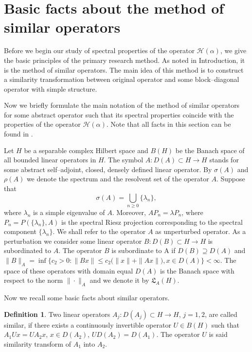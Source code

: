 \documentclass[11pt,centertags,reqno,twoside]{amsart}
\numberwithin{equation}{section}
\theoremstyle{definition}
\newtheorem{definition}[theorem]{Definition}
\theoremstyle{remark}
\begin{document}
\section{Basic facts about the method of similar operators}\label{sec4}

Before we begin our study of spectral properties of the operator $\mathcal{H}(\alpha)$,
we give the basic principles of the primary research method. As noted in Introduction,
it is the method of similar operators. The main idea of this method is to construct
a similarity transformation between original operator and some block--diagonal
operator with simple structure.

Now we briefly formulate the main notation of the method of similar operators
for some abstract operator such that its spectral properties coincide
with the properties of the operator $\mathcal{H}(\alpha)$. Note that all facts
in this section can be found in \cite[\S~2, 3]{BaskKrUsk}.

Let $H$ be a separable complex Hilbert space and $B(H)$ be the Banach space of
all bounded linear operators in $H$. The symbol $A: D(A)\subset H\to H$
stands for some abstract self--adjoint, closed, densely defined linear operator.
By $\sigma(A)$ and $\rho(A)$ we denote the spectrum and the resolvent set of
the operator $A$. Suppose that
\[
\sigma(A)=\bigcup_{n\geqslant 0}\{\lambda_n\},
\]
where $\lambda_n$ is a simple eigenvalue of $A$.
Moreover, $AP_n=\lambda P_n$, where $P_n=P(\{\lambda_n\}, A)$ is the spectral Riesz
projection corresponding to the spectral component $\{\lambda_n\}$. We shall refer
to the operator $A$ as unperturbed operator. As a perturbation we consider some
linear operator $B: D(B)\subset H\to H$ is subordinated to $A$. The operator
$B$ is subordinate to A if $D(B)\supseteq D(A)$ and $\|B\|_A=\inf\{c_2>0:
\|Bx\|\leqslant c_2\big(\|x\|+\|Ax\|\big), x\in D(A)\}<\infty$. The space of these
operators with domain equal $D(A)$ is the Banach space with respect to the norm
$\|\cdot\|_A$ and we denote it by $\mathfrak{L}_A(H)$.

Now we recall some basic facts about similar operators.
\begin{definition}\label{def1}
Two linear operators $A_j: D(A_j)\subset H\to H$, $j=1, 2$, are called similar,
if there exists a continuously invertible operator $U\in B(H)$ such that
$A_1Ux=UA_2x$, $x\in D(A_2)$, $UD(A_2)=D(A_1)$. The operator $U$ is said
similarity transform of $A_1$ into $A_2$.
\end{definition}
\end{document}
